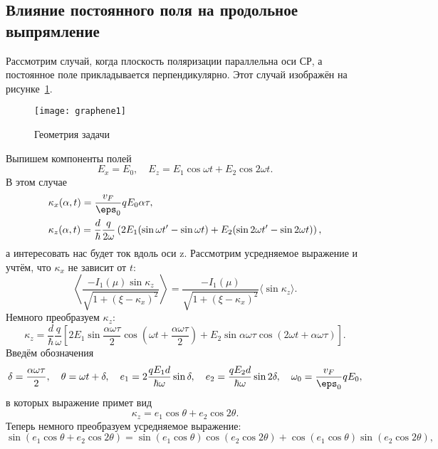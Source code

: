 \subsection{Влияние постоянного поля на продольное выпрямление}
Рассмотрим случай, когда плоскость поляризации параллельна оси СР, а постоянное поле прикладывается перпендикулярно. Этот случай изображён на рисунке~\ref{fig:geometry1}.
\begin{figure}[!h]
    \center
    \texttt{[image: graphene1]}
    \caption{Геометрия задачи}
    \label{fig:geometry1}
\end{figure}

Выпишем компоненты полей
\begin{equation*}
  E_x = E_0,\quad E_z = E_1\cos\omega t + E_2\cos2\omega t.
\end{equation*}
В этом случае
\begin{align*}
    &\kappa_x(\alpha, t) = \frac{v_F}{\eps_0}qE_0\alpha\tau,\\
    &\kappa_z(\alpha, t) = \frac{d}{\hbar} \frac{q}{2\omega}\left(2E_1(\sin\omega t' - \sin\omega t) + E_2(\sin2\omega t' - \sin2\omega t)\right),
\end{align*}
а интересовать нас будет ток вдоль оси z. Рассмотрим усредняемое выражение и учтём, что \(\kappa_x\) не зависит от \(t\):
\begin{equation*}
  \left\langle\frac{-I_1(\mu)\sin\kappa_z}{\sqrt{1+(\xi-\kappa_x)^2}}\right\rangle = \frac{-I_1(\mu)}{\sqrt{1+(\xi-\kappa_x)^2}}\langle\sin\kappa_z\rangle.
\end{equation*}
Немного преобразуем \( \kappa_z \):
\begin{equation*}
  \kappa_z = \frac{d}{\hbar} \frac{q}{\omega}\left[2E_1 \sin\frac{\alpha\omega\tau}{2}\cos\left(\omega t + \frac{\alpha\omega\tau}{2}\right) + E_2\sin\alpha\omega\tau\cos\left(2\omega t + \alpha\omega\tau\right)\right].
\end{equation*}
Введём обозначения
\begin{equation*}
  \delta = \frac{\alpha\omega\tau}{2},\quad
  \theta = \omega t + \delta,\quad
  e_1 = 2\frac{qE_1d}{\hbar\omega}\sin\delta,\quad
  e_2 = \frac{qE_2d}{\hbar\omega}\sin2\delta,\quad
  \omega_0 = \frac{v_F}{\eps_0}qE_0,
\end{equation*}
в которых выражение примет вид
\begin{equation*}
  \kappa_z = e_1\cos\theta + e_2\cos2\theta.
\end{equation*}
Теперь немного преобразуем усредняемое выражение:
\begin{equation*}
  \sin(e_1\cos\theta + e_2\cos2\theta) =
  \sin(e_1\cos\theta)\cos(e_2\cos2\theta) +
  \cos(e_1\cos\theta)\sin(e_2\cos2\theta),
\end{equation*}
